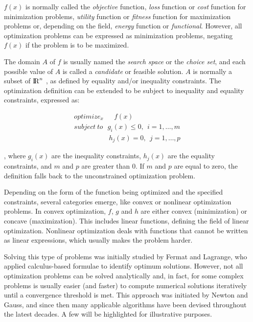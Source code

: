 $ f(x) $  is normally called the \textit{objective} function, \textit{loss} function or \textit{cost} function for minimization problems, \textit{utility} function or \textit{fitness} function for maximization problems or, depending on the field, \textit{energy} function or \textit{functional}. However, all optimization problems can be expressed as minimization problems, negating  $ f(x) $  if the problem is to be maximized.

The domain  $ A $ of $ f $ is usually named the \textit{search space} or the \textit{choice set}, and each possible value of  $ A $  is called a \textit{candidate} or feasible solution.  $ A $  is normally a subset of ${\rm I\!R}^{n} $ , as defined by equality and/or inequality constraints. The optimization definition can be extended to be subject to inequality and equality constraints, expressed as:

\begin{align}
	optimize_{x}~~~~~~~ f(x) \nonumber \\
	subject~to~~~  g_{i}(x)  \leq 0,~~ i=1,  \ldots ,m \nonumber \\
	~~~~~~~~~~~~~~~~~~~~~~~ h_{j}(x) =0,~~ j=1,  \ldots ,p
\end{align}

, where  \( g_{i}(x)  \)  are the inequality constraints,  \( h_{j}(x)  \)  are the equality constraints, and  \( m \)  and  \( p \)  are greater than 0. If  \( m \)  and  \( p \)  are equal to zero, the definition falls back to the unconstrained optimization problem.

Depending on the form of the function being optimized and the specified constraints, several categories emerge, like convex or nonlinear optimization problems. In convex optimization, $f$, $g$ and $h$ are either convex (minimization) or concave (maximization). This includes linear functions, defining the field of linear optimization. Nonlinear optimization deals with functions that cannot be written as linear expressions, which usually makes the problem harder.

Solving this type of problems was initially studied by Fermat and Lagrange, who applied calculus-based formulae to identify optimum solutions. However, not all optimization problems can be solved analytically and, in fact, for some complex problems is usually easier (and faster) to compute numerical solutions iteratively until a convergence threshold is met. This approach was initiated by Newton and Gauss, and since then many applicable algorithms have been devised throughout the latest decades. A few will be highlighted for illustrative purposes.


